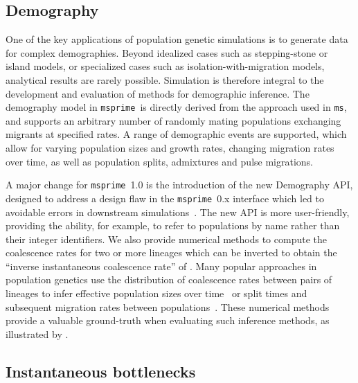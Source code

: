 \documentclass[9pt,twocolumn,twoside,lineno]{gsajnl}
\newcommand{\msprime}[0]{\texttt{msprime}}
\newcommand{\ms}[0]{\texttt{ms}}
\begin{document}
\subsection*{Demography}
\label{sec-demography}
One of the key applications of population genetic simulations is to generate
data for complex demographies. Beyond idealized cases such as stepping-stone or
island models, or specialized cases such as isolation-with-migration models,
analytical results are rarely possible. Simulation is therefore integral to the
development and evaluation of methods for demographic inference. The demography
model in \msprime\ is directly derived from the approach used in \ms, and
supports an arbitrary number of randomly mating populations exchanging migrants
at specified rates. A range of demographic events are supported, which allow for
varying population sizes and growth rates, changing migration rates over time,
as well as population splits, admixtures and pulse migrations.

A major change for \msprime\ 1.0 is the introduction of the new Demography API,
designed to address a design flaw in the \msprime\ 0.x interface which led to
avoidable errors in downstream simulations~\citep{ragsdale2020lessons}.
The new API is more user-friendly, providing the ability, for example,
to refer to populations by name rather than their integer identifiers.
We also provide numerical methods to compute
the coalescence rates for two or more lineages
which can be inverted to obtain the
``inverse instantaneous coalescence rate'' of \citet{chikhi2018iicr}.
Many popular approaches in population genetics use the distribution of
coalescence rates between pairs of lineages to infer
effective population sizes over
time~\citep{li2011inference,sheehan2013estimating,schiffels2014inferring} or
split times and subsequent migration rates between
populations~\citep{wang2020tracking}.
These numerical methods provide a valuable
ground-truth when evaluating such inference methods, as illustrated by
\cite{adrion2020community}.

\subsection*{Instantaneous bottlenecks}
\end{document}
